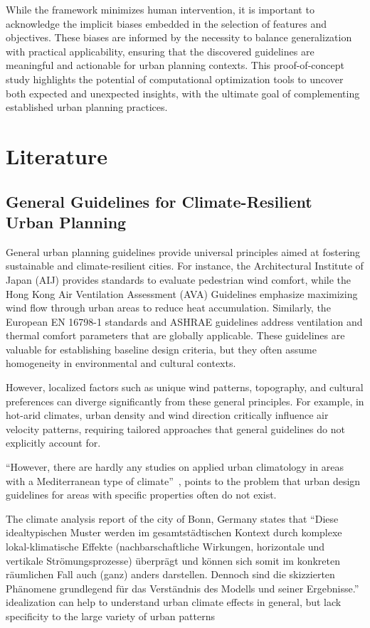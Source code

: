 \documentclass[times,final]{elsarticle}
\begin{document}
While the framework minimizes human intervention, it is important to acknowledge the implicit biases embedded in the selection of features and objectives. These biases are informed by the necessity to balance generalization with practical applicability, ensuring that the discovered guidelines are meaningful and actionable for urban planning contexts. This proof-of-concept study highlights the potential of computational optimization tools to uncover both expected and unexpected insights, with the ultimate goal of complementing established urban planning practices.

\section{Literature}
\subsection{General Guidelines for Climate-Resilient Urban Planning}

General urban planning guidelines provide universal principles aimed at fostering sustainable and climate-resilient cities. For instance, the Architectural Institute of Japan (AIJ) provides standards to evaluate pedestrian wind comfort, while the Hong Kong Air Ventilation Assessment (AVA) Guidelines emphasize maximizing wind flow through urban areas to reduce heat accumulation. Similarly, the European EN 16798-1 standards and ASHRAE guidelines address ventilation and thermal comfort parameters that are globally applicable. These guidelines are valuable for establishing baseline design criteria, but they often assume homogeneity in environmental and cultural contexts.


However, localized factors such as unique wind patterns, topography, and cultural preferences can diverge significantly from these general principles. For example, in hot-arid climates, urban density and wind direction critically influence air velocity patterns, requiring tailored approaches that general guidelines do not explicitly account for. 

``However, there are hardly any studies on applied urban climatology in areas with a Mediterranean type of climate''~\cite{alcoforado2009application}, points to the problem that urban design guidelines for areas with specific properties often do not exist. 

The climate analysis report of the city of Bonn, Germany states that ``Diese idealtypischen Muster werden im gesamtstädtischen Kontext durch komplexe lokal-klimatische Effekte (nachbarschaftliche Wirkungen, horizontale und vertikale Strömungsprozesse) überprägt und können sich somit im konkreten räumlichen Fall auch (ganz) anders darstellen. Dennoch sind die skizzierten Phänomene grundlegend für das Verständnis des Modells und seiner Ergebnisse.'' idealization can help to understand urban climate effects in general, but lack specificity to the large variety of urban patterns ~\cite{berchtold2023MUTABOR}
\end{document}
